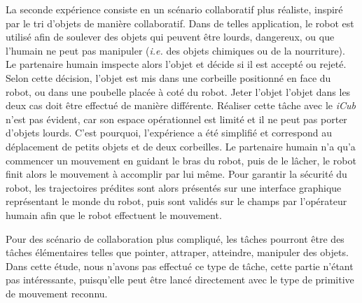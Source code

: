 \documentclass[utf8]{frontiersSCNS} %
\begin{document}
La seconde expérience consiste en un scénario collaboratif plus réaliste, inspiré par le tri d'objets de manière collaboratif. 
Dans de telles application, le robot est utilisé afin de soulever des objets qui peuvent être lourds, dangereux, ou que l'humain ne peut pas manipuler (\textit{i.e.} des objets chimiques ou de la nourriture). Le partenaire humain imspecte alors l'objet et décide si il est accepté ou rejeté. Selon cette décision, l'objet est mis dans une corbeille positionné en face du robot, ou dans une poubelle placée à coté du robot. 
Jeter l'objet l'objet dans les deux cas doit être effectué de manière différente. Réaliser cette tâche avec le \textit{iCub} n'est pas évident, car son espace opérationnel est limité et il ne peut pas porter d'objets lourds. C'est pourquoi, l'expérience a été simplifié et correspond au déplacement de petits objets et de deux corbeilles. Le partenaire humain n'a qu'a commencer un mouvement en guidant le bras du robot, puis de le lâcher, le robot finit alors le mouvement à accomplir par lui même.
Pour garantir la sécurité du robot, les trajectoires prédites sont alors présentés sur une interface graphique représentant le monde du robot, puis sont validés sur le champs par l'opérateur humain afin que le robot effectuent le mouvement.

Pour des scénario de collaboration plus compliqué, les tâches pourront être des tâches élémentaires telles que pointer, attraper, atteindre, manipuler des objets. Dans cette étude, nous n'avons pas effectué ce type de tâche, cette partie n'étant pas intéressante, puisqu'elle peut être lancé directement avec le type de primitive de mouvement reconnu.
\end{document}
